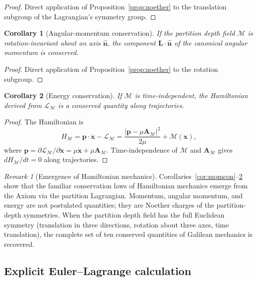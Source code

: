 \documentclass[11pt,twocolumn,a4paper]{article}
\theoremstyle{axiomstyle}
\theoremstyle{conseqstyle}
\newtheorem{corollary}{Corollary}
\theoremstyle{definition}
\theoremstyle{remark}
\newtheorem*{remark}{Remark}
\newcommand{\Depth}{\mathcal{M}}
\newcommand{\Apartition}{\bm{A}_{\Depth}}
\newcommand{\Lagr}{\mathcal{L}}
\begin{document}
\begin{proof}
Direct application of Proposition~\ref{prop:noether} to the translation subgroup of the Lagrangian's symmetry group.
\end{proof}

\begin{corollary}[Angular-momentum conservation]
\label{cor:angmom}
If the partition depth field $\Depth$ is rotation-invariant about an axis $\hat{\mathbf{n}}$, the component $\mathbf{L}\cdot\hat{\mathbf{n}}$ of the canonical angular momentum is conserved.
\end{corollary}

\begin{proof}
Direct application of Proposition~\ref{prop:noether} to the rotation subgroup.
\end{proof}

\begin{corollary}[Energy conservation]
\label{cor:encon}
If $\Depth$ is time-independent, the Hamiltonian derived from $\Lagr_{\Depth}$ is a conserved quantity along trajectories.
\end{corollary}

\begin{proof}
The Hamiltonian is
\begin{equation*}
H_{\Depth}=\mathbf{p}\cdot\dot{\mathbf{x}}-\Lagr_{\Depth}=\frac{|\mathbf{p}-\mu\Apartition|^{2}}{2\mu}+\Depth(\mathbf{x}),
\end{equation*}
where $\mathbf{p}=\partial\Lagr_{\Depth}/\partial\dot{\mathbf{x}}=\mu\dot{\mathbf{x}}+\mu\Apartition$. Time-independence of $\Depth$ and $\Apartition$ gives $dH_{\Depth}/dt=0$ along trajectories.
\end{proof}

\begin{remark}[Emergence of Hamiltonian mechanics]
Corollaries~\ref{cor:momcon}--\ref{cor:encon} show that the familiar conservation laws of Hamiltonian mechanics emerge from the Axiom via the partition Lagrangian. Momentum, angular momentum, and energy are not postulated quantities; they are Noether charges of the partition-depth symmetries. When the partition depth field has the full Euclidean symmetry (translation in three directions, rotation about three axes, time translation), the complete set of ten conserved quantities of Galilean mechanics is recovered.
\end{remark}

\subsection{Explicit Euler--Lagrange calculation}
\end{document}
